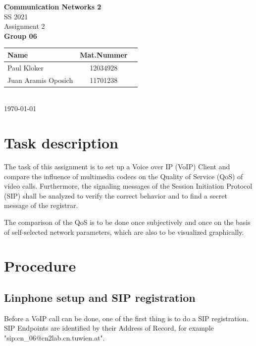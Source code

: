 \documentclass[parskip=full]{scrartcl}
\begin{document}
\begin{titlepage}
    \centering
    \vspace*{2cm}
    {\Huge \textbf{Communication Networks 2}}\\
    SS 2021\\
    \vspace*{1cm}
    {\Large Assignment 2}
    \\\vspace*{3cm}
    {\Large \textbf{Group 06}}\\
    \vspace*{1cm}
    {\large 
        \begin{tabular}{l c c}
            Name & Mat.Nummer \\ \hline
            Paul Kloker & 12034928 \\
            Juan Aramis Oposich & 11701238
        \end{tabular}
    }
    \\\vspace*{7cm}
    \today
\end{titlepage}

\section{Task description} \label{sec:task}
The task of this assignment is to set up a Voice over IP (VoIP) Client and compare the influence of multimedia codecs on the Quality of Service (QoS) of video calls.
Furthermore, the signaling messages of the Session Initiation Protocol (SIP) shall be analyzed to verify the correct behavior and to find a secret message of the registrar.

The comparison of the QoS is to be done once subjectively and once on the basis of self-selected network parameters, which are also to be visualized graphically. 


\section{Procedure} \label{sec:procedure}

\subsection{Linphone setup and SIP registration} \label{subsec:setup}
Before a VoIP call can be done, one of the first thing is to do a SIP registration. SIP Endpoints are identified by their Address of Record, for example "sip:cn\_06@cn2lab.cn.tuwien.at".
\end{document}
